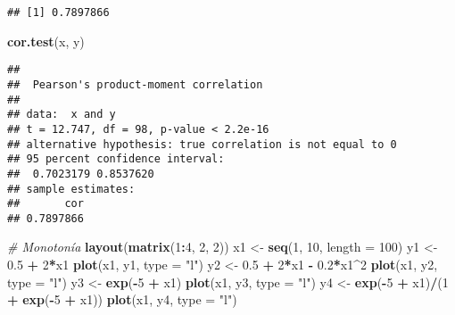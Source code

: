 \documentclass[
]{book}
\newenvironment{Shaded}{\begin{snugshade}}{\end{snugshade}}
\newcommand{\CommentTok}[1]{\textcolor[rgb]{0.56,0.35,0.01}{\textit{#1}}}
\newcommand{\DataTypeTok}[1]{\textcolor[rgb]{0.13,0.29,0.53}{#1}}
\newcommand{\DecValTok}[1]{\textcolor[rgb]{0.00,0.00,0.81}{#1}}
\newcommand{\FloatTok}[1]{\textcolor[rgb]{0.00,0.00,0.81}{#1}}
\newcommand{\KeywordTok}[1]{\textcolor[rgb]{0.13,0.29,0.53}{\textbf{#1}}}
\newcommand{\NormalTok}[1]{#1}
\newcommand{\OperatorTok}[1]{\textcolor[rgb]{0.81,0.36,0.00}{\textbf{#1}}}
\newcommand{\StringTok}[1]{\textcolor[rgb]{0.31,0.60,0.02}{#1}}
\begin{document}
\begin{verbatim}
## [1] 0.7897866
\end{verbatim}

\begin{Shaded}
\begin{Highlighting}[]
\KeywordTok{cor.test}\NormalTok{(x, y)}
\end{Highlighting}
\end{Shaded}

\begin{verbatim}
## 
##  Pearson's product-moment correlation
## 
## data:  x and y
## t = 12.747, df = 98, p-value < 2.2e-16
## alternative hypothesis: true correlation is not equal to 0
## 95 percent confidence interval:
##  0.7023179 0.8537620
## sample estimates:
##       cor 
## 0.7897866
\end{verbatim}

\begin{Shaded}
\begin{Highlighting}[]
\CommentTok{# Monotonía}
\KeywordTok{layout}\NormalTok{(}\KeywordTok{matrix}\NormalTok{(}\DecValTok{1}\OperatorTok{:}\DecValTok{4}\NormalTok{, }\DecValTok{2}\NormalTok{, }\DecValTok{2}\NormalTok{))}
\NormalTok{x1 <-}\StringTok{ }\KeywordTok{seq}\NormalTok{(}\DecValTok{1}\NormalTok{, }\DecValTok{10}\NormalTok{, }\DataTypeTok{length =} \DecValTok{100}\NormalTok{)}
\NormalTok{y1 <-}\StringTok{ }\FloatTok{0.5} \OperatorTok{+}\StringTok{ }\DecValTok{2}\OperatorTok{*}\NormalTok{x1}
\KeywordTok{plot}\NormalTok{(x1, y1, }\DataTypeTok{type =} \StringTok{"l"}\NormalTok{)}
\NormalTok{y2 <-}\StringTok{ }\FloatTok{0.5} \OperatorTok{+}\StringTok{ }\DecValTok{2}\OperatorTok{*}\NormalTok{x1 }\OperatorTok{-}\StringTok{ }\FloatTok{0.2}\OperatorTok{*}\NormalTok{x1}\OperatorTok{^}\DecValTok{2}
\KeywordTok{plot}\NormalTok{(x1, y2, }\DataTypeTok{type =} \StringTok{"l"}\NormalTok{)}
\NormalTok{y3 <-}\StringTok{ }\KeywordTok{exp}\NormalTok{(}\OperatorTok{-}\DecValTok{5} \OperatorTok{+}\StringTok{ }\NormalTok{x1)}
\KeywordTok{plot}\NormalTok{(x1, y3, }\DataTypeTok{type =} \StringTok{"l"}\NormalTok{)}
\NormalTok{y4 <-}\StringTok{ }\KeywordTok{exp}\NormalTok{(}\OperatorTok{-}\DecValTok{5} \OperatorTok{+}\StringTok{ }\NormalTok{x1)}\OperatorTok{/}\NormalTok{(}\DecValTok{1} \OperatorTok{+}\StringTok{ }\KeywordTok{exp}\NormalTok{(}\OperatorTok{-}\DecValTok{5} \OperatorTok{+}\StringTok{ }\NormalTok{x1))}
\KeywordTok{plot}\NormalTok{(x1, y4, }\DataTypeTok{type =} \StringTok{"l"}\NormalTok{)}
\end{Highlighting}
\end{Shaded}
\end{document}
